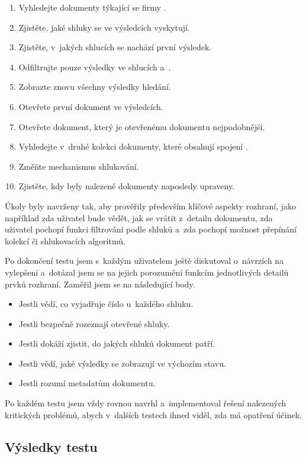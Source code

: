 \begin{enumerate}
\item Vyhledejte dokumenty týkající se firmy .
\item Zjistěte, jaké shluky se ve výsledcích vyskytují.
\item Zjistěte, v~jakých shlucích se nachází první výsledek.
\item \label{task_clusterfilter}Odfiltrujte pouze výsledky ve shlucích  a~.
\item Zobrazte znovu všechny výsledky hledání.
\item Otevřete první dokument ve výsledcích.
\item Otevřete dokument, který je otevřenému dokumentu nejpodobnější.
\item Vyhledejte v~druhé kolekci dokumenty, které obsahují spojení .
\item \label{task_engine}Změňte mechanismus shlukování.
\item Zjistěte, kdy byly nalezené dokumenty naposledy upraveny.
\end{enumerate}

Úkoly byly navrženy tak, aby prověřily především klíčové aspekty rozhraní, jako například zda uživatel bude vědět, jak se vrátit z~detailu dokumentu, zda uživatel pochopí funkci filtrování podle shluků a~zda pochopí možnost přepínání kolekcí či shlukovacích algoritmů.

Po dokončení testu jsem s~každým uživatelem ještě diskutoval o~návrzích na vylepšení a~dotázal jsem se na jejich porozumění funkcím jednotlivých detailů prvků rozhraní. Zaměřil jsem se na následující body.

\begin{itemize}
\item Jestli vědí, co vyjadřuje číslo u~každého shluku.
\item Jestli bezpečně rozeznají otevřené shluky.
\item Jestli dokáží zjistit, do jakých shluků dokument patří.
\item Jestli vědí, jaké výsledky se zobrazují ve výchozím stavu.
\item Jestli rozumí metadatům dokumentu.
\end{itemize}

Po každém testu jsem vždy rovnou navrhl a~implementoval řešení nalezených kritických problémů, abych v~dalších testech ihned viděl, zda má opatření účinek.

\subsection{Výsledky testu}
